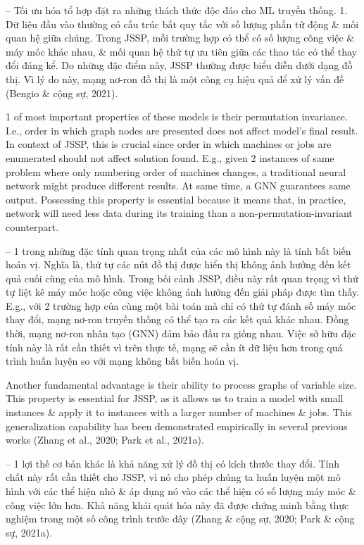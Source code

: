 \documentclass{article}
\begin{document}
\begin{itemize}
    -- Tối ưu hóa tổ hợp đặt ra những thách thức độc đáo cho ML truyền thống. 1. Dữ liệu đầu vào thường có cấu trúc bất quy tắc với số lượng phần tử động \& mối quan hệ giữa chúng. Trong JSSP, mỗi trường hợp có thể có số lượng công việc \& máy móc khác nhau, \& mối quan hệ thứ tự ưu tiên giữa các thao tác có thể thay đổi đáng kể. Do những đặc điểm này, JSSP thường được biểu diễn dưới dạng đồ thị. Vì lý do này, mạng nơ-ron đồ thị là một công cụ hiệu quả để xử lý vấn đề (Bengio \& cộng sự, 2021).

    1 of most important properties of these models is their permutation invariance. I.e., order in which graph nodes are presented does not affect model's final result. In context of JSSP, this is crucial since order in which machines or jobs are enumerated should not affect solution found. E.g., given 2 instances of same problem where only numbering order of machines changes, a traditional neural network might produce different results. At same time, a GNN guarantees same output. Possessing this property is essential because it means that, in practice, network will need less data during its training than a non-permutation-invariant counterpart.

    -- 1 trong những đặc tính quan trọng nhất của các mô hình này là tính bất biến hoán vị. Nghĩa là, thứ tự các nút đồ thị được hiển thị không ảnh hưởng đến kết quả cuối cùng của mô hình. Trong bối cảnh JSSP, điều này rất quan trọng vì thứ tự liệt kê máy móc hoặc công việc không ảnh hưởng đến giải pháp được tìm thấy. E.g., với 2 trường hợp của cùng một bài toán mà chỉ có thứ tự đánh số máy móc thay đổi, mạng nơ-ron truyền thống có thể tạo ra các kết quả khác nhau. Đồng thời, mạng nơ-ron nhân tạo (GNN) đảm bảo đầu ra giống nhau. Việc sở hữu đặc tính này là rất cần thiết vì trên thực tế, mạng sẽ cần ít dữ liệu hơn trong quá trình huấn luyện so với mạng không bất biến hoán vị.

    Another fundamental advantage is their ability to process graphs of variable size. This property is essential for JSSP, as it allows us to train a model with small instances \& apply it to instances with a larger number of machines \& jobs. This generalization capability has been demonstrated empirically in several previous works (Zhang et al., 2020; Park et al., 2021a).

    -- 1 lợi thế cơ bản khác là khả năng xử lý đồ thị có kích thước thay đổi. Tính chất này rất cần thiết cho JSSP, vì nó cho phép chúng ta huấn luyện một mô hình với các thể hiện nhỏ \& áp dụng nó vào các thể hiện có số lượng máy móc \& công việc lớn hơn. Khả năng khái quát hóa này đã được chứng minh bằng thực nghiệm trong một số công trình trước đây (Zhang \& cộng sự, 2020; Park \& cộng sự, 2021a).


\end{itemize}
\end{document}
